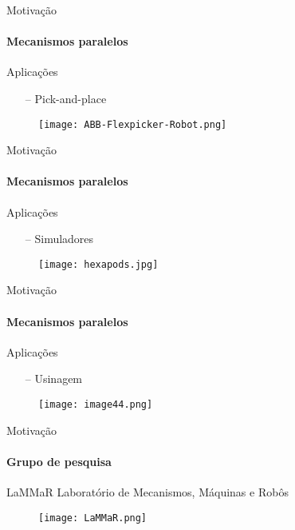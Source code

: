\documentclass[25pt,landscape]{beamer}
\begin{document}
\begin{frame}{Motiva\c{c}\~ao}
    \framesubtitle{Mecanismos paralelos}
    \begin{block}{Aplica\c{c}\~oes}
        \begin{itemize}
            \item[--] Pick-and-place
        \end{itemize}
    \end{block}
    \begin{figure}[!h]
        \centering
        \texttt{[image: ABB-Flexpicker-Robot.png]}
    \end{figure}  
\end{frame}

\begin{frame}{Motiva\c{c}\~ao}
    \framesubtitle{Mecanismos paralelos}
    \begin{block}{Aplica\c{c}\~oes}
        \begin{itemize}
            \item[--] Simuladores
        \end{itemize}
    \end{block}
    \begin{figure}[!h]
        \centering
        \texttt{[image: hexapods.jpg]}
    \end{figure}  
\end{frame}

\begin{frame}{Motiva\c{c}\~ao}
    \framesubtitle{Mecanismos paralelos}
    \begin{block}{Aplica\c{c}\~oes}
        \begin{itemize}
            \item[--] Usinagem
        \end{itemize}
    \end{block}
    \begin{figure}[!h]
        \centering
        \texttt{[image: image44.png]}
    \end{figure}  
\end{frame}


\begin{frame}{Motiva\c{c}\~ao}
	\framesubtitle{Grupo de pesquisa}
	\pause
	\begin{block}{LaMMaR}
		Laborat\'orio de Mecanismos, M\'aquinas e Rob\^os
    \end{block}
    \begin{figure}[!h]
        \centering
        \texttt{[image: LaMMaR.png]}
    \end{figure}
\end{frame}
\end{document}
